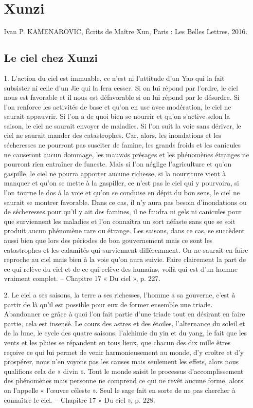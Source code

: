 \chapter{Xunzi}

Ivan P. KAMENAROVIC, Écrits de Maître Xun, Paris : Les Belles Lettres, 2016.


\section{Le ciel chez Xunzi}

1.	L’action du ciel est immuable, ce n’est ni l’attitude d’un Yao qui la fait subsister ni celle d’un Jie qui la fera cesser. Si on lui répond par l’ordre, le ciel nous est favorable et il nous est défavorable si on lui répond par le désordre. Si l’on renforce les activités de base et qu’on en use avec modération, le ciel ne saurait appauvrir. Si l’on a de quoi bien se nourrir et qu’on s’active selon la saison, le ciel ne saurait envoyer de maladies. Si l’on suit la voie sans dériver, le ciel ne saurait mander des catastrophes. Car, alors, les inondations et les sécheresses ne pourront pas susciter de famine, les grands froids et les canicules ne causeront aucun dommage, les mauvais présages et les phénomènes étranges ne pourront rien entraîner de funeste. Mais si l’on néglige l’agriculture et qu’on gaspille, le ciel ne pourra apporter aucune richesse, si la nourriture vient à manquer et qu’on se mette à la gaspiller, ce n’est pas le ciel qui y pourvoira, si l’on tourne le dos à la voie et qu’on se conduise en dépit du bon sens, le ciel ne saurait se montrer favorable. Dans ce cas, il n’y aura pas besoin d’inondations ou de sécheresses pour qu’il y ait des famines, il ne faudra ni gels ni canicules pour que surviennent les maladies et l’on connaîtra un sort néfaste sans que se soit produit aucun phénomène rare ou étrange. Les saisons, dans ce cas, se succèdent aussi bien que lors des périodes de bon gouvernement mais ce sont les catastrophes et les calamités qui surviennent différemment. On ne saurait en faire reproche au ciel mais bien à la voie qu’on aura suivie. Faire clairement la part de ce qui relève du ciel et de ce qui relève des humains, voilà qui est d’un homme vraiment complet.
-- Chapitre 17 « Du ciel », p. 227.

2.	Le ciel a ses saisons, la terre a ses richesses, l’homme a sa gouverne, c’est à partir de là qu’il est possible pour eux de former ensemble une triade. Abandonner ce grâce à quoi l’on fait partie d’une triade tout en désirant en faire partie, cela est insensé. Le cours des astres et des étoiles, l’alternance du soleil et de la lune, le cycle des quatre saisons, l’alchimie du yin et du yang, le fait que les vents et les pluies se répandent en tous lieux, que chacun des dix mille êtres reçoive ce qui lui permet de venir harmonieusement au monde, d’y croître et d’y prospérer, nous n’en voyons pas les causes mais seulement les effets, alors nous qualifions cela de « divin ». Tout le monde saisit le processus d’accomplissement des phénomènes mais personne ne comprend ce qui ne revêt aucune forme, alors on l’appelle « l’œuvre céleste ». Seul le sage fait en sorte de ne pas chercher à connaître le ciel.
-- Chapitre 17 « Du ciel », p. 228.

